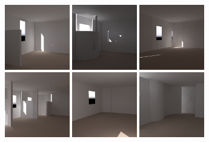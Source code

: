\documentclass[review]{vgtc}                 %
\begin{document}
\begin{figure}[t]

\includegraphics[width=1.11in]{images/renderings/renovations/050_camera_chris_march.png}   %
\includegraphics[width=1.11in]{images/renderings/renovations/050_camera_chris_march_mod.png}  \hfill %
\includegraphics[width=1.11in]{images/renderings/renovations/user_046_camera_chris_march.png}   %
\includegraphics[width=1.11in]{images/renderings/renovations/user_046_camera_chris_march_mod.png} \hfill  %
\includegraphics[width=1.11in]{images/renderings/renovations/042_camera_chris_december}    %
\includegraphics[width=1.11in]{images/renderings/renovations/042_camera_chris_december_mod}    %


\end{figure}
\end{document}
